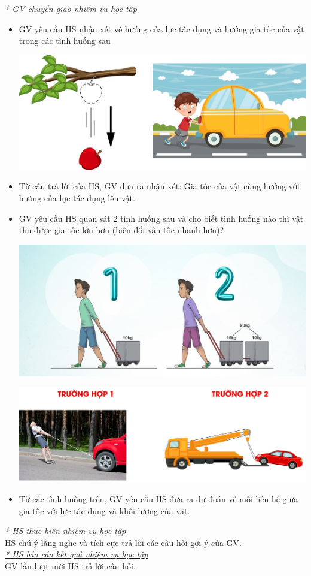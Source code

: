 {\textit{\underline{* GV chuyển giao nhiệm vụ học tập}}
	\begin{itemize}[label=-]
		\item GV yêu cầu HS nhận xét về hướng của lực tác dụng và hướng gia tốc của vật trong các tình huống sau
		\begin{center}
			\includegraphics[scale=0.5]{figs/G10-BAI10-5}
		\end{center}
		\item Từ câu trả lời của HS, GV đưa ra nhận xét: Gia tốc của vật cùng hướng với hướng của lực tác dụng lên vật.
		\item GV yêu cầu HS quan sát 2 tình huống sau và cho biết tình huống nào thì vật thu được gia tốc lớn hơn (biến đổi vận tốc nhanh hơn)?
		\begin{center}
			\includegraphics[scale=0.4]{figs/G10-BAI10-6}
		\end{center}
		\begin{center}
			\includegraphics[scale=0.45]{figs/G10-BAI10-7}
		\end{center}
		\item Từ các tình huống trên, GV yêu cầu HS đưa ra dự đoán về mối liên hệ giữa gia tốc với lực tác dụng và khối lượng của vật.
	\end{itemize}
	\textit{\underline{* HS thực hiện nhiệm vụ học tập}}\\
	HS chú ý lắng nghe và tích cực trả lời các câu hỏi gợi ý của GV.\\
	\textit{\underline{* HS báo cáo kết quả nhiệm vụ học tập}}\\
	GV lần lượt mời HS trả lời câu hỏi.
}

